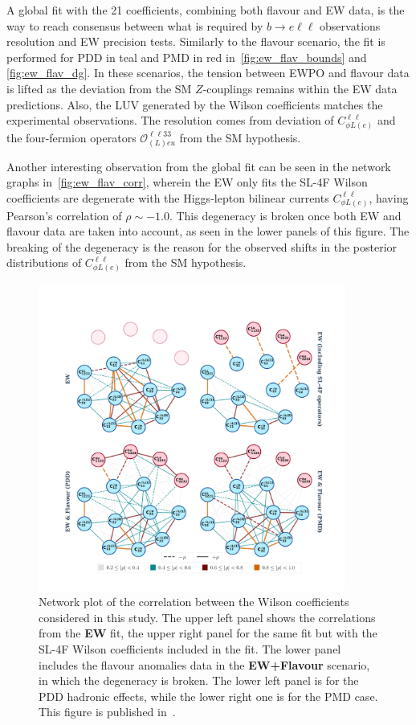\par A global fit with the 21 coefficients, combining both flavour and EW data, is the way to reach consensus between what is required by $ b \to e \ell \ell$ observations resolution and EW precision tests. Similarly to the flavour scenario, the fit is performed for PDD in \textcolor[HTML]{0f7678}{teal} and PMD in \textcolor[HTML]{760003}{red} in~\autoref{fig:ew_flav_bounds} and \autoref{fig:ew_flav_dg}. In these scenarios, the tension between EWPO and flavour data is lifted as the deviation from the SM $Z$-couplings remains within the EW data predictions. Also, the LUV generated by the Wilson coefficients matches the experimental observations. The resolution comes from deviation of $C_{\phi L (e)}^{\ell \ell}$ and the four-fermion operators $\mathcal{O}_{(L)eu}^{\ell \ell 3 3}$ from the SM hypothesis. 
\par Another interesting observation from the global fit can be seen in the network graphs in~\autoref{fig:ew_flav_corr}, wherein the EW only fits the SL-4F Wilson coefficients are degenerate with the Higgs-lepton bilinear currents $C_{\phi L (e)}^{\ell \ell}$, having Pearson's correlation of  $\rho \sim -1.0$. This degeneracy is broken once both EW and flavour data are taken into account, as seen in the lower panels of this figure. The breaking of the degeneracy is the reason for the observed shifts in the posterior distributions of $C_{\phi L (e)}^{\ell \ell}$ from the SM hypothesis. 
\begin{figure}[h!]
	\centering
	\includegraphics[width=0.9\textwidth]{figures/fixed_EW_flavour.pdf}
	\caption{ Network plot of the correlation between the Wilson coefficients considered in this study. The upper left panel shows the correlations from the \textbf{EW} fit, the upper right panel for the same fit but with the SL-4F Wilson coefficients included in the fit. The lower panel includes the flavour anomalies data in the \textbf{EW+Flavour}  scenario, in which the degeneracy is broken. The lower left panel is for the PDD hadronic effects, while the lower right one is for the PMD case. This figure is published in~\cite{Alasfar:2020mne}. 
	}
	\label{fig:ew_flav_corr}
\end{figure}
